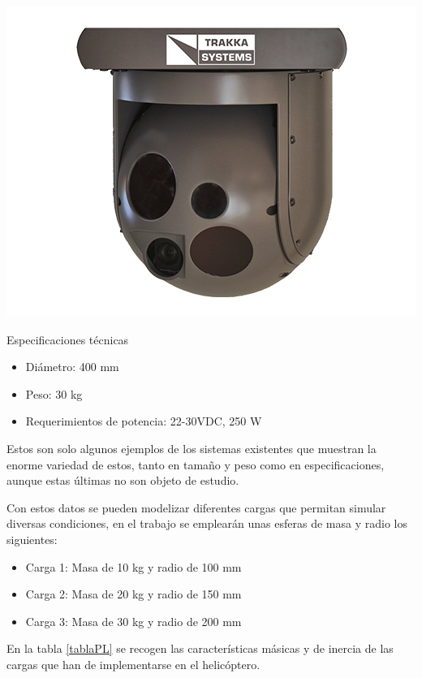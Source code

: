 \noindent\begin{minipage}{0.3\textwidth}%
	\includegraphics[width=\linewidth]{imagenes/400-le}
\end{minipage}%
\hfill%
\begin{minipage}{0.7\textwidth}
	Especificaciones técnicas
	\begin{itemize}
		\item Diámetro: 400 mm
		\item Peso: 30 kg
		\item Requerimientos de potencia: 22-30VDC, 250 W
	\end{itemize}
\end{minipage}

Estos son solo algunos ejemplos de los sistemas existentes que muestran la enorme variedad de estos, tanto en tamaño y peso como en especificaciones, aunque estas últimas no son objeto de estudio.

Con estos datos se pueden modelizar diferentes cargas que permitan simular diversas condiciones, en el trabajo se emplearán  unas esferas de masa y radio los siguientes:

\begin{itemize}
	\item Carga 1: Masa de 10 kg y radio de 100 mm
	\item Carga 2: Masa de 20 kg y radio de 150 mm
	\item Carga 3: Masa de 30 kg y radio de 200 mm
\end{itemize}

En la tabla \ref{tablaPL} se recogen las características másicas y de inercia de las cargas que han de implementarse en el helicóptero.

